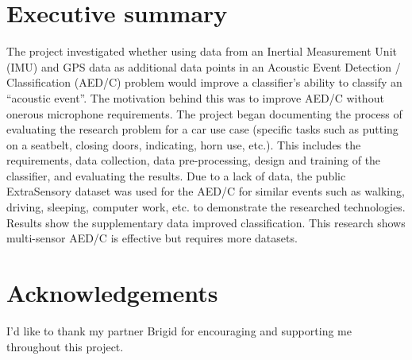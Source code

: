 \documentclass{UoNMCHA}
\numberwithin{equation}{section}
\begin{document}
\section*{Executive summary}
\vspace{-3mm}
The project investigated whether using data from an Inertial Measurement Unit (IMU) and GPS data as additional data points in an Acoustic Event Detection / Classification (AED/C) problem would improve a classifier's ability to classify an “acoustic event”. The motivation behind this was to improve AED/C without onerous microphone requirements. The project began documenting the process of evaluating the research problem for a car use case (specific tasks such as putting on a seatbelt, closing doors, indicating, horn use, etc.). This includes the requirements, data collection, data pre-processing, design and training of the classifier, and evaluating the results. Due to a lack of data, the public ExtraSensory dataset was used for the AED/C for similar events such as walking, driving, sleeping, computer work, etc. to demonstrate the researched technologies. Results show the supplementary data improved classification. This research shows multi-sensor AED/C is effective but requires more datasets.

\vspace{-2mm}
\section*{Acknowledgements}
\vspace{-3mm}
I'd like to thank my partner Brigid for encouraging and supporting me throughout this project.
\newpage
\tableofcontents
\newpage
\end{document}

